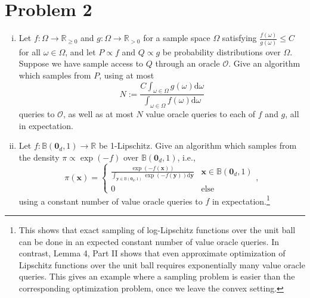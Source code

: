\section*{Problem 2}

\begin{enumerate}[(i)]
\item Let $f : \Omega \to \mathbb{R}_{\geq 0}$ and $g : \Omega \to \mathbb{R}_{>0}$ for a sample space $\Omega$ satisfying $\frac{f(\omega)}{g(\omega)} \leq C$ for all $\omega \in \Omega$, and let $P \propto f$ and $Q \propto g$ be probability distributions over $\Omega$. Suppose we have sample access to $Q$ through an oracle $\mathcal{O}$. Give an algorithm which samples from $P$, using at most
\[
N := \frac{C \int_{\omega \in \Omega} g(\omega) \mathrm{d}\omega}{\int_{\omega \in \Omega} f(\omega) \mathrm{d}\omega}
\]
queries to $\mathcal{O}$, as well as at most $N$ value oracle queries to each of $f$ and $g$, all in expectation.

\item Let $f : \mathbb{B}(\mathbf{0}_d, 1) \to \mathbb{R}$ be 1-Lipschitz. Give an algorithm which samples from the density $\pi \propto \exp(-f)$ over $\mathbb{B}(\mathbf{0}_d, 1)$, i.e.,
\[
\pi(\mathbf{x}) = \begin{cases} \frac{\exp(-f(\mathbf{x}))}{\int_{\mathbf{y} \in \mathbb{B}(\mathbf{0}_d, 1)} \exp(-f(\mathbf{y})) \mathrm{d}\mathbf{y}} & \mathbf{x} \in \mathbb{B}(\mathbf{0}_d, 1) \\ 0 & \text{else} \end{cases},
\]
using a constant number of value oracle queries to $f$ in expectation.\footnote{This shows that exact sampling of log-Lipschitz functions over the unit ball can be done in an expected constant number of value oracle queries. In contrast, Lemma 4, Part II shows that even approximate optimization of Lipschitz functions over the unit ball requires exponentially many value oracle queries. This gives an example where a sampling problem is easier than the corresponding optimization problem, once we leave the convex setting.}
\end{enumerate}
